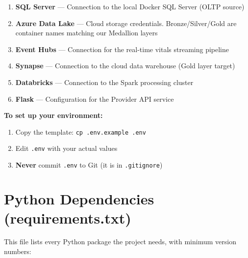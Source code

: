\documentclass[12pt, a4paper, oneside]{report}
\begin{document}
\begin{enumerate}[label=\textcolor{primary}{\textbf{\arabic*.}}]
    \item \textbf{SQL Server} --- Connection to the local Docker SQL Server (OLTP source)
    \item \textbf{Azure Data Lake} --- Cloud storage credentials. Bronze/Silver/Gold are container names matching our Medallion layers
    \item \textbf{Event Hubs} --- Connection for the real-time vitals streaming pipeline
    \item \textbf{Synapse} --- Connection to the cloud data warehouse (Gold layer target)
    \item \textbf{Databricks} --- Connection to the Spark processing cluster
    \item \textbf{Flask} --- Configuration for the Provider API service
\end{enumerate}

\begin{importantbox}
    \textbf{To set up your environment:}
    \begin{enumerate}
        \item Copy the template: \texttt{cp .env.example .env}
        \item Edit \texttt{.env} with your actual values
        \item \textbf{Never} commit \texttt{.env} to Git (it is in \texttt{.gitignore})
    \end{enumerate}
\end{importantbox}

\section{Python Dependencies (requirements.txt)}

This file lists every Python package the project needs, with minimum version numbers:
\end{document}
